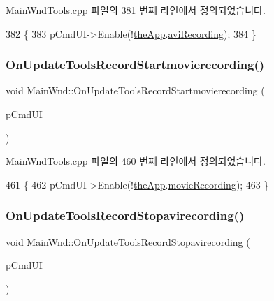 Main\+Wnd\+Tools.\+cpp 파일의 381 번째 라인에서 정의되었습니다.


\begin{DoxyCode}
382 \{
383   pCmdUI->Enable(!\mbox{\hyperlink{_v_b_a_8cpp_a8095a9d06b37a7efe3723f3218ad8fb3}{theApp}}.\mbox{\hyperlink{class_v_b_a_a96743b6c6ee2d9b45c52b981136e3738}{aviRecording}});
384 \}
\end{DoxyCode}
\mbox{\label{class_main_wnd_acd6ea3612f6959388549defbb7398b16}} 
\subsubsection{\texorpdfstring{On\+Update\+Tools\+Record\+Startmovierecording()}{OnUpdateToolsRecordStartmovierecording()}}
{\footnotesize\ttfamily void Main\+Wnd\+::\+On\+Update\+Tools\+Record\+Startmovierecording (\begin{DoxyParamCaption}\item[{C\+Cmd\+UI $\ast$}]{p\+Cmd\+UI }\end{DoxyParamCaption})\hspace{0.3cm}{\ttfamily [protected]}}



Main\+Wnd\+Tools.\+cpp 파일의 460 번째 라인에서 정의되었습니다.


\begin{DoxyCode}
461 \{
462   pCmdUI->Enable(!\mbox{\hyperlink{_v_b_a_8cpp_a8095a9d06b37a7efe3723f3218ad8fb3}{theApp}}.\mbox{\hyperlink{class_v_b_a_a7fbf39fb4604c00c8ad139b2e27f3756}{movieRecording}});
463 \}
\end{DoxyCode}
\mbox{\label{class_main_wnd_a3265cdcc2e36ee6c34137fc470b6b7e0}} 
\subsubsection{\texorpdfstring{On\+Update\+Tools\+Record\+Stopavirecording()}{OnUpdateToolsRecordStopavirecording()}}
{\footnotesize\ttfamily void Main\+Wnd\+::\+On\+Update\+Tools\+Record\+Stopavirecording (\begin{DoxyParamCaption}\item[{C\+Cmd\+UI $\ast$}]{p\+Cmd\+UI }\end{DoxyParamCaption})\hspace{0.3cm}{\ttfamily [protected]}}



